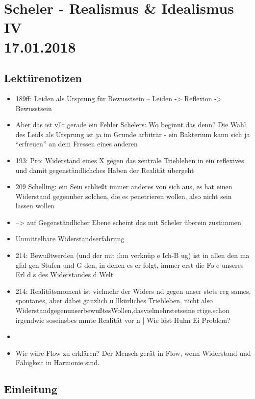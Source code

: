 \documentclass[emulatestandardclasses]{scrartcl}
\begin{document}
\section{Scheler - Realismus \& Idealismus IV\\17.01.2018}

\subsection{Lektürenotizen}

\begin{itemize}
  \item 189ff: Leiden als Ursprung für Bewusstsein -- Leiden -> Reflexion -> Bewusstsein
  \item Aber das ist vllt gerade ein Fehler Schelers: Wo beginnt das denn? Die Wahl des Leids als Ursprung ist ja im Grunde arbiträr - ein Bakterium kann sich ja "`erfreuen"' an dem Fressen eines anderen
  \item 193: Pro: Widerstand eines X gegen das zentrale Triebleben  in ein reflexives und damit gegenständlichches Haben der Realität übergeht
  \item 209 Schelling: ein Sein schließt immer anderes von sich aus, es hat einen Widerstand gegenüber solchen, die es penetrieren wollen, also nicht sein lassen wollen
  \item --> auf Gegenständlicher Ebene scheint das mit Scheler überein zustimmen
  \item Unmittelbare Widerstandserfahrung
  \item 214: Bewußtwerden (und der mit ihm verknüp e Ich-B ug) ist in allen den ma gfal gen Stufen und G den, in denen es er­ folgt, immer erst die Fo e unseres Erl d s des Widerstandes d  Welt
  \item 214: Realitätsmoment ist vielmehr der Widers nd gegen unser stets reg­ sames, spontanes, aber dabei gänzlich u llkürliches Triebleben, nicht also WiderstandgegenunserbewußtesWollen,dasvielmehrstetseine rtige,schon irgendwie soseinsbes mmte Realität vor n | Wie löst Huhn Ei Problem?
  \item 
\end{itemize}


\begin{itemize}
  \item Wie wäre Flow zu erklären? Der Mensch gerät in Flow, wenn Widerstand und Fähigkeit in Harmonie sind.  
\end{itemize}

\subsection{Einleitung}
\end{document}
